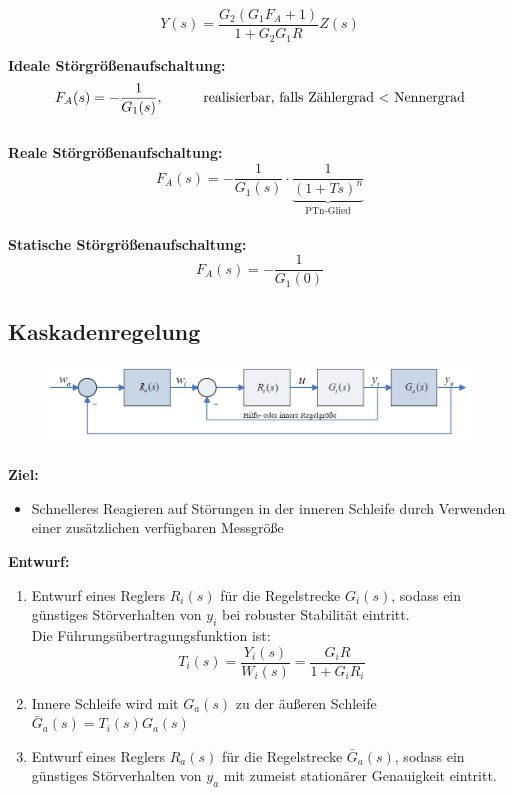 \documentclass[10pt,a4paper]{article}
\newcommand{\tab}[1][1]{\hspace*{#1cm}}
\begin{document}
$$
	Y(s) = \frac{G_2(G_1 F_A + 1)}{1 + G_2 G_1 R} Z(s)
$$

\textbf{Ideale Störgrößenaufschaltung:}
$$
	F_A(s) = -\frac{1}{G_1(s)}, \tab \text{realisierbar, falls Zählergrad $<$ Nennergrad}
$$ ~\\

\textbf{Reale Störgrößenaufschaltung:}
$$
	F_A(s) = -\frac{1}{G_1(s)} ⋅ \underbrace{\frac{1}{(1 + Ts)^n}}_{\text{PTn-Glied}}
$$ ~\\

\textbf{Statische Störgrößenaufschaltung:}
$$
	F_A(s) = -\frac{1}{G_1(0)}
$$

\subsection{Kaskadenregelung}
\begin{figure}[H]
	\includegraphics[width=0.8\columnwidth]{imgs/abb7_5.png}
\end{figure}

\textbf{Ziel:}
\begin{itemize}
	\item Schnelleres Reagieren auf Störungen in der inneren Schleife durch Verwenden einer zusätzlichen verfügbaren Messgröße
\end{itemize}

\textbf{Entwurf:}
\begin{enumerate}
	\item Entwurf eines Reglers $R_i(s)$ für die Regelstrecke $G_i(s)$, sodass ein günstiges Störverhalten von $y_i$ bei robuster Stabilität eintritt. \\
	Die Führungsübertragungsfunktion ist:
	$$
		T_i(s) = \frac{Y_i(s)}{W_i(s)} = \frac{G_i R}{1 + G_i R_i}
	$$
	\item Innere Schleife wird mit $G_a(s)$ zu der äußeren Schleife $\bar{G}_a(s) = T_i(s)G_a(s)$
	\item Entwurf eines Reglers $R_a(s)$ für die Regelstrecke $\bar G_a(s)$, sodass ein günstiges Störverhalten von $y_a$ mit zumeist stationärer Genauigkeit eintritt. \\
\end{enumerate}
\end{document}
